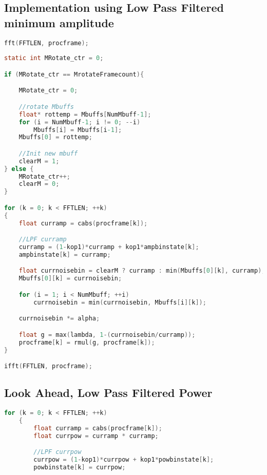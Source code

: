 \documentclass[11pt]{article} %
\begin{document}
{ \subsection{Implementation using Low Pass Filtered minimum amplitude} %
 \label{sub:implementation_using_low_pass_filtered_minimum_amplitude}
 \begin{center}
 	\begin{lstlisting}[language = C]
fft(FFTLEN, procframe);
									
static int MRotate_ctr = 0;

if (MRotate_ctr == MrotateFramecount){

	MRotate_ctr = 0;

	//rotate Mbuffs
	float* rottemp = Mbuffs[NumMbuff-1];
	for (i = NumMbuff-1; i != 0; --i)
		Mbuffs[i] = Mbuffs[i-1];
	Mbuffs[0] = rottemp;

	//Init new mbuff
	clearM = 1;
} else {
	MRotate_ctr++;
	clearM = 0;
}

for (k = 0; k < FFTLEN; ++k)
{
	float curramp = cabs(procframe[k]); 

	//LPF curramp
	curramp = (1-kop1)*curramp + kop1*ampbinstate[k];
	ampbinstate[k] = curramp;

	float currnoisebin = clearM ? curramp : min(Mbuffs[0][k], curramp);
	Mbuffs[0][k] = currnoisebin;

	for (i = 1; i < NumMbuff; ++i)
		currnoisebin = min(currnoisebin, Mbuffs[i][k]);

	currnoisebin *= alpha;

	float g = max(lambda, 1-(currnoisebin/curramp));
	procframe[k] = rmul(g, procframe[k]);
}

ifft(FFTLEN, procframe);
 	\end{lstlisting}
 \end{center}



  \subsection{Look Ahead, Low Pass Filtered Power} %
 \label{app:delayprepipe}
 \begin{center}
 	\begin{lstlisting}[language = C]
	for (k = 0; k < FFTLEN; ++k)
	{
		float curramp = cabs(procframe[k]);
		float currpow = curramp * curramp;

		//LPF currpow
		currpow = (1-kop1)*currpow + kop1*powbinstate[k];
		powbinstate[k] = currpow;


\end{lstlisting}
\end{center}}
\end{document}
